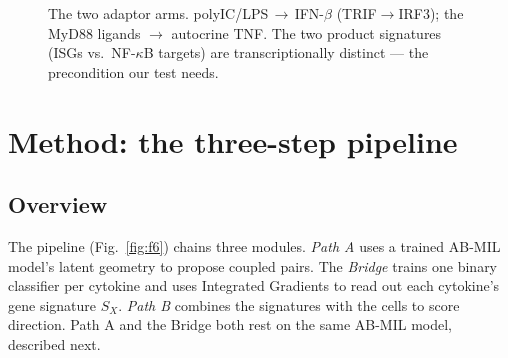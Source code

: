 \documentclass[11pt]{article}
\newcommand{\ifnb}{\textnormal{IFN-}\ensuremath{\beta}}
\newcommand{\nfkb}{\textnormal{NF-}\ensuremath{\kappa}\textnormal{B}}
\newcommand{\Sx}{\ensuremath{S_X}}
\begin{document}
\begin{figure}[h]\centering
{}
\caption{The two adaptor arms. polyIC/LPS$\,\to\,$\ifnb{} (TRIF$\to$IRF3); the
MyD88 ligands $\to$ autocrine TNF. The two product signatures (ISGs vs.\ \nfkb{}
targets) are transcriptionally distinct --- the precondition our test needs.}
\label{fig:f5}
\end{figure}

\section{Method: the three-step pipeline}\label{sec:method}

\subsection{Overview}
The pipeline (Fig.~\ref{fig:f6}) chains three modules. \emph{Path A} uses a trained
AB-MIL model's latent geometry to propose coupled pairs. The \emph{Bridge} trains
one binary classifier per cytokine and uses Integrated Gradients to read out each
cytokine's gene signature \Sx{}. \emph{Path B} combines the signatures with the
cells to score direction. Path A and the Bridge both rest on the same AB-MIL
model, described next.
\end{document}
